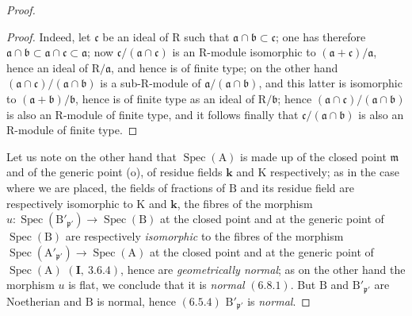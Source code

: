 \begin{proof}
\begin{proof}
Indeed, let $\mathfrak{c}$ be an ideal of $\mathrm{R}$ such that $\mathfrak{a}\cap\mathfrak{b}\subset\mathfrak{c}$; one has therefore $\mathfrak{a}\cap\mathfrak{b}\subset\mathfrak{a}\cap\mathfrak{c}\subset\mathfrak{a}$; now
$\mathfrak{c}/(\mathfrak{a}\cap\mathfrak{c})$ is an $\mathrm{R}$-module isomorphic to $(\mathfrak{a}+\mathfrak{c})/\mathfrak{a}$, hence an ideal of $\mathrm{R}/\mathfrak{a}$, and hence
is of finite type; on the other hand $(\mathfrak{a}\cap\mathfrak{c})/(\mathfrak{a}\cap\mathfrak{b})$ is a sub-$\mathrm{R}$-module of $\mathfrak{a}/(\mathfrak{a}\cap\mathfrak{b})$, and
this latter is isomorphic to $(\mathfrak{a}+\mathfrak{b})/\mathfrak{b}$, hence is of finite type as an ideal of $\mathrm{R}/\mathfrak{b}$;
hence $(\mathfrak{a}\cap\mathfrak{c})/(\mathfrak{a}\cap\mathfrak{b})$ is also an $\mathrm{R}$-module of finite type, and it follows finally that
$\mathfrak{c}/(\mathfrak{a}\cap\mathfrak{b})$ is also an $\mathrm{R}$-module of finite type.
\end{proof}

Let us note on the other hand that $\operatorname{Spec}(\mathrm{A})$ is made up of the closed point $\mathfrak{m}$ and of the generic
point (o), of residue fields $\boldsymbol{k}$ and $\mathrm{K}$ respectively; as in the case where we
are placed, the fields of fractions of $\mathrm{B}$ and its residue field are respectively
isomorphic to $\mathrm{K}$ and $\boldsymbol{k}$, the fibres of the morphism $u:\operatorname{Spec}(\mathrm{B}'_{\mathfrak{p}'})\to\operatorname{Spec}(\mathrm{B})$ at the closed point
and at the generic point of $\operatorname{Spec}(\mathrm{B})$ are respectively \emph{isomorphic} to the fibres of the morphism
$\operatorname{Spec}(\mathrm{A}'_{\mathfrak{p}'})\to\operatorname{Spec}(\mathrm{A})$ at the closed point and at the generic point of $\operatorname{Spec}(\mathrm{A})$ $(\mathbf{I},~3.6.4)$, hence
are \emph{geometrically normal}; as on the other hand the morphism $u$ is flat,
we conclude that it is \emph{normal} $(6.8.1)$. But $\mathrm{B}$ and $\mathrm{B}'_{\mathfrak{p}'}$ are Noetherian and $\mathrm{B}$ is normal, hence
$(6.5.4)$ $\mathrm{B}'_{\mathfrak{p}'}$ is \emph{normal}.


\end{proof}
